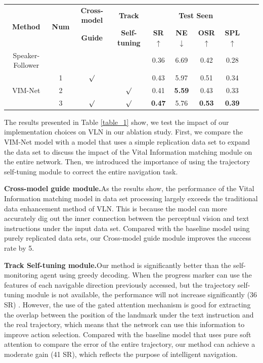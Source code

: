 \vspace{-2em}
\begin{table}[h]
	\centering
	{\begin{tabular}[c]{cccccccccc}
			\toprule[1pt]
			\multirow{2}{*}{{\textbf{Method}}} & \multirow{2}{*}{{\textbf{Num}}} & \multicolumn{1}{c}{{\textbf{Cross-model}}}  & \multicolumn{1}{c}{{\textbf{Track}} } &\multicolumn{4}{c}{{\textbf{Test Seen}}} \\
			
			& &\textbf{Guide} &\textbf{Self-tuning} & \textbf{SR}$\uparrow$ & \textbf{NE}$\downarrow$ & \textbf{OSR}$\uparrow$ & \textbf{SPL}$\uparrow$\\
			\toprule[1pt]
			
			Speaker-Follower   & & & & 0.36 & 6.69 & 0.42 & 0.28 \\
			\toprule[1pt]
			\multirow{3}{*}{VIM-Net}  &1& $\surd$ & & 0.43 &  5.97 &  0.51 & 0.34  \\
			   &2& & $\surd$ & 0.41 & \textbf{5.59} & 0.43 & 0.33  \\
				 &3& $\surd$ & $\surd$ & \textbf{0.47} &  5.76 & \textbf{0.53} & \textbf{0.39} \\
			\bottomrule[1pt]
		\end{tabular}
		\label{table_2}}
\end{table}
The results presented in Table \ref{table_1} show, we test the impact of our implementation choices on VLN in our ablation study. First, we compare the VIM-Net model with a model that uses a simple replication data set to expand the data set to discuss the impact of the Vital Information matching module on the entire network. Then, we introduced the importance of using the trajectory self-tuning module to correct the entire navigation task.

\textbf{Cross-model guide module.}As the results show, the performance of the Vital Information matching model in data set processing largely exceeds the traditional data enhancement method of VLN. This is because the model can more accurately dig out the inner connection between the perceptual vision and text instructions under the input data set. Compared with the baseline model using purely replicated data sets, our Cross-model guide module improves the success rate by 5.

\textbf{Track Self-tuning module.}Our method is significantly better than the self-monitoring agent using greedy decoding. When the progress marker can use the features of each navigable direction previously accessed, but the trajectory self-tuning module is not available, the performance will not increase significantly (36 SR) . However, the use of the gated attention mechanism is good for extracting the overlap between the position of the landmark under the text instruction and the real trajectory, which means that the network can use this information to improve action selection. Compared with the baseline model that uses pure soft attention to compare the error of the entire trajectory, our method can achieve a moderate gain (41 SR), which reflects the purpose of intelligent navigation.

